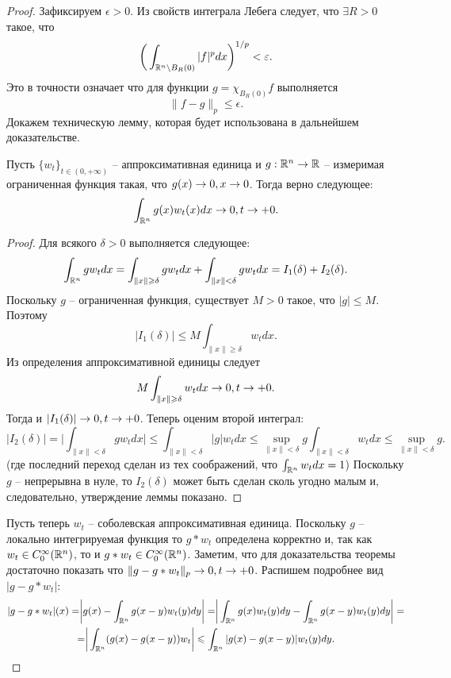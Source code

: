 \begin{proof}
    Зафиксируем $\epsilon > 0$.
    Из свойств интеграла Лебега следует, что $\exists R > 0$ такое, что
    \[
        \biggr(\int_{\mathbb{R}^n \setminus B_R(0)} |f|^p dx\biggr)^{1/p} < \varepsilon.
    \]
    Это в точности означает что для функции $g = \chi_{B_R(0)}f$ выполняется
    \[
        \|f - g\|_p \leq \epsilon.
    \]
    Докажем техническую лемму, которая будет использована в дальнейшем доказательстве.
    \begin{lemma}
        Пусть $\{w_t\}_{t \in (0, +\infty)}$ -- аппроксимативная единица и $g: \mathbb{R}^n \to \mathbb{R}$ -- измеримая ограниченная функция такая, что $g(x) \rightarrow 0, x \rightarrow 0$.
        Тогда верно следующее:
        \[
            \int_{\mathbb{R}^n} g(x)w_t(x)dx \rightarrow 0, t \rightarrow +0.
        \]
    \end{lemma}
    \begin{proof}
        Для всякого $\delta > 0$ выполняется следующее:
        \[
            \int_{\mathbb{R}^n} gw_t dx = \int_{\|x\| \geqslant \delta} gw_t dx + \int_{\|x\| < \delta} gw_t dx = I_1(\delta) + I_2(\delta).
        \]
        Поскольку $g$ -- ограниченная функция, существует $M > 0$ такое, что $|g| \leq M$.
        Поэтому
        \[
            |I_1(\delta)| \leq M \int_{\|x\| \geq \delta} w_t dx.
        \]
        Из определения аппроксимативной единицы следует
        \[
            M \int_{\|x\| \geqslant \delta} w_t dx \rightarrow 0, t \rightarrow  +0.
        \]
        Тогда и $|I_1(\delta)| \rightarrow 0, t \rightarrow +0$.
        Теперь оценим второй интеграл:
        \[
            |I_2(\delta)| = \biggr|\int_{\|x\| < \delta}g w_t dx\biggr| \leq \int_{\|x\| < \delta} |g|w_t dx \leq \sup\limits_{\|x\| < \delta} g \int_{\|x\| < \delta} w_t dx \leq \sup\limits_{\|x\| < \delta} g.
        \]
        (где последний переход сделан из тех соображений, что $\int_{\mathbb{R}^n} w_t dx = 1$)
        Поскольку $g$ -- непрерывна в нуле, то $I_2(\delta)$ может быть сделан сколь угодно малым и, следовательно, утверждение леммы показано.
    \end{proof}
    Пусть теперь $w_t$ -- соболевская аппроксимативная единица.
    Поскольку $g$ -- локально интегрируемая функция то $g * w_t$ определена корректно и, так как $w_t \in C_0^\infty(\mathbb{R}^n)$, то и $g * w_t \in C_0^\infty(\mathbb{R}^n)$.
    Заметим, что для доказательства теоремы достаточно показать что $\|g - g * w_t\|_p \rightarrow 0, t \rightarrow +0$.
    Распишем подробнее вид $|g - g * w_t|$:
    \begin{multline*}
        |g - g * w_t|(x) = \biggr| g(x) - \int_{\R^n} g(x - y)w_t(y)dy \biggr| = \biggr|\int_{\R^n} g(x)w_t(y)dy - \int_{\R^n} g(x - y)w_t(y)dy\biggr| = \\ = \biggr|\int_{\R^n} (g(x) - g(x - y))w_t\biggr| \leq \int_{\R^n} |g(x) - g(x - y)|w_t(y)dy.

\end{multline*}
\end{proof}
